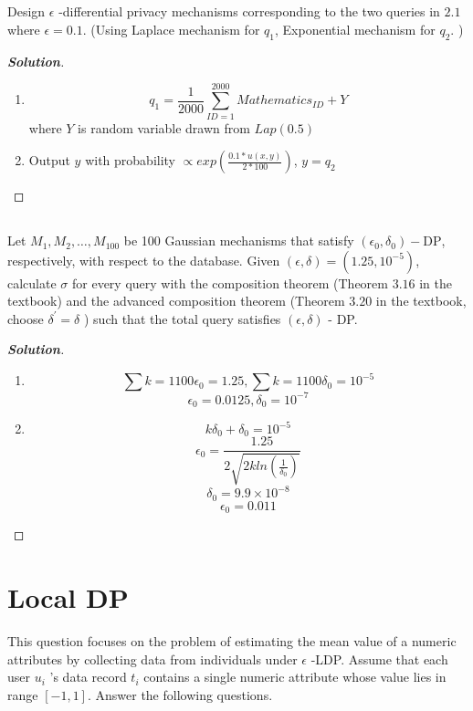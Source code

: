 \documentclass{ctexart}
\newenvironment{solution}{\begin{proof}[\indent\bf Solution]}{\end{proof}}
\begin{document}
\subsection{}
Design $\epsilon$ -differential privacy mechanisms corresponding to the two queries in $2.1$ where $\epsilon=0.1 .$ (Using Laplace mechanism for $q_{1}$, Exponential mechanism for $q_{2} .$ )
\begin{solution}
    \begin{enumerate}\item \par$$q_{1}=\frac{1}{2000} \sum_{I D=1}^{2000} Mathematics _{I D} + Y$$
              where $Y$ is random variable drawn from $Lap\left(0.5\right)$
        \item Output $y$ with probability $\propto exp\left( \frac{0.1*u(x,y) }{2*100}\right)$, $y=q_{2}$
    \end{enumerate}
\end{solution}
\subsection{}
Let $M_{1}, M_{2}, \ldots, M_{100}$ be 100 Gaussian mechanisms that satisfy $\left(\epsilon_{0}, \delta_{0}\right)-\mathrm{DP}$, respectively, with respect to the database. Given $(\epsilon, \delta)=\left(1.25,10^{-5}\right)$, calculate $\sigma$ for every query with the composition theorem (Theorem $3.16$ in the textbook) and the advanced composition theorem (Theorem $3.20$ in the textbook, choose $\delta^{\prime}=\delta$ ) such that the total query satisfies $(\epsilon, \delta)$ - DP.
\begin{solution}
    \begin{enumerate}
        \item $$\sum{k=1}{100}\epsilon_{0}=1.25,\sum{k=1}{100}\delta_{0}=10^{-5} $$
              $$\epsilon_{0}=0.0125,\delta_{0}=10^{-7}$$
        \item $$k\delta_{0} + \delta_{0}=10^{-5}$$
              $$\epsilon_{0}=\frac{1.25}{2\sqrt{2k ln(\frac{1}{\delta_{0}})}}$$
              $$\delta_{0}=9.9\times10^{-8}$$
              $$\epsilon_{0}=0.011$$
    \end{enumerate}
\end{solution}
\section{Local DP}

This question focuses on the problem of estimating the mean value of a numeric attributes by collecting data from individuals under $\epsilon$ -LDP. Assume that each user $u_{i}$ 's data record $t_{i}$ contains a single numeric attribute whose value lies in range $[-1,1]$. Answer the following questions.
\end{document}
